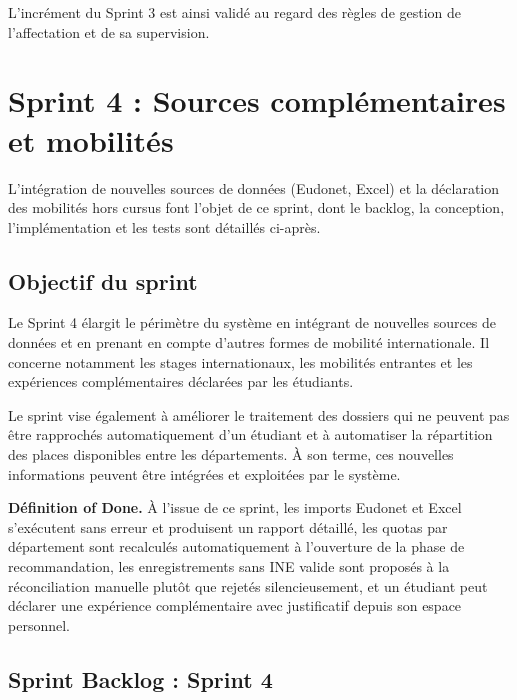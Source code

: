 L'incrément du Sprint 3 est ainsi validé au regard des règles de gestion de l'affectation et de sa supervision.


\section{Sprint 4 : Sources complémentaires et mobilités}

L'intégration de nouvelles sources de données (Eudonet, Excel) et la déclaration des mobilités hors cursus font l'objet de ce sprint, dont le backlog, la conception, l'implémentation et les tests sont détaillés ci-après.

\subsection{Objectif du sprint}

Le Sprint 4 élargit le périmètre du système en intégrant de nouvelles sources de données et en prenant en compte d'autres formes de mobilité internationale. Il concerne notamment les stages internationaux, les mobilités entrantes et les expériences complémentaires déclarées par les étudiants.

Le sprint vise également à améliorer le traitement des dossiers qui ne peuvent pas être rapprochés automatiquement d'un étudiant et à automatiser la répartition des places disponibles entre les départements. À son terme, ces nouvelles informations peuvent être intégrées et exploitées par le système.

\textbf{Définition of Done.} À l'issue de ce sprint, les imports Eudonet et Excel s'exécutent sans erreur et produisent un rapport détaillé, les quotas par département sont recalculés automatiquement à l'ouverture de la phase de recommandation, les enregistrements sans INE valide sont proposés à la réconciliation manuelle plutôt que rejetés silencieusement, et un étudiant peut déclarer une expérience complémentaire avec justificatif depuis son espace personnel.

\setcounter{tasknum}{1}

\newcommand{\usheaderteal}[2]{%
  \multicolumn{6}{|p{\uswidth}|}{%
    \cellcolor{teal!8}%
    \textbf{#1} : \small\textit{#2}%
  } \\ \hline
}

\subsection{Sprint Backlog : Sprint 4}

